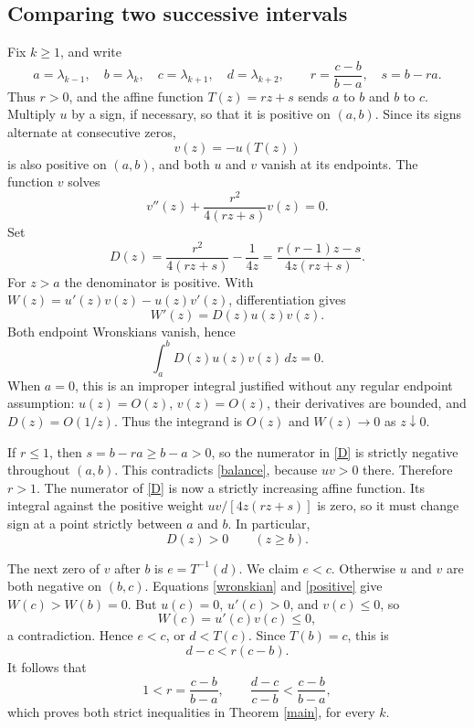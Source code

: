 \documentclass[11pt]{article}
\begin{document}
\subsection*{Comparing two successive intervals}
Fix $k\geq1$, and write
\[
 a=\lambda_{k-1},\quad b=\lambda_k,\quad c=\lambda_{k+1},
 \quad d=\lambda_{k+2},\qquad
 r=\frac{c-b}{b-a},\quad s=b-ra.
\]
Thus $r>0$, and the affine function $T(z)=rz+s$ sends $a$ to $b$
and $b$ to $c$. Multiply $u$ by a sign, if necessary, so that it is
positive on $(a,b)$. Since its signs alternate at consecutive zeros,
\[
 v(z)=-u(T(z))
\]
is also positive on $(a,b)$, and both $u$ and $v$ vanish at its endpoints.
The function $v$ solves
\[
 v''(z)+\frac{r^2}{4(rz+s)}v(z)=0.
\]
Set
\begin{equation}\label{D}
 D(z)=\frac{r^2}{4(rz+s)}-\frac1{4z}
 =\frac{r(r-1)z-s}{4z(rz+s)}.
\end{equation}
For $z>a$ the denominator is positive. With
$W(z)=u'(z)v(z)-u(z)v'(z)$, differentiation gives
\begin{equation}\label{wronskian}
 W'(z)=D(z)u(z)v(z).
\end{equation}
Both endpoint Wronskians vanish, hence
\begin{equation}\label{balance}
 \int_a^b D(z)u(z)v(z)\,dz=0.
\end{equation}
When $a=0$, this is an improper integral justified without any regular
endpoint assumption: $u(z)=O(z)$, $v(z)=O(z)$, their derivatives are
bounded, and $D(z)=O(1/z)$. Thus the integrand is $O(z)$ and
$W(z)\to0$ as $z\downarrow0$.

If $r\leq1$, then $s=b-ra\geq b-a>0$, so the numerator in \eqref{D}
is strictly negative throughout $(a,b)$. This contradicts \eqref{balance},
because $uv>0$ there. Therefore $r>1$.
The numerator of \eqref{D} is now a strictly increasing affine function.
Its integral against the positive weight $uv/[4z(rz+s)]$ is zero, so
it must change sign at a point strictly between $a$ and $b$.
In particular,
\begin{equation}\label{positive}
 D(z)>0\qquad(z\geq b).
\end{equation}

The next zero of $v$ after $b$ is $e=T^{-1}(d)$.
We claim $e<c$. Otherwise $u$ and $v$ are both negative on $(b,c)$.
Equations \eqref{wronskian} and \eqref{positive} give $W(c)>W(b)=0$.
But $u(c)=0$, $u'(c)>0$, and $v(c)\leq0$, so
\[
 W(c)=u'(c)v(c)\leq0,
\]
a contradiction. Hence $e<c$, or $d<T(c)$. Since $T(b)=c$, this is
\[
 d-c<r(c-b).
\]
It follows that
\[
 1<r=\frac{c-b}{b-a},\qquad
 \frac{d-c}{c-b}<\frac{c-b}{b-a},
\]
which proves both strict inequalities in Theorem \ref{main}, for every $k$.
\end{document}

